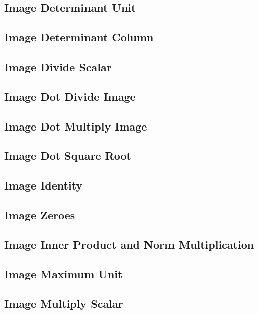 \documentclass[11pt]{article}
\begin{document}
\subsection{Image Determinant Unit}

\subsection{Image Determinant Column}

\subsection{Image Divide Scalar}

\subsection{Image Dot Divide Image}

\subsection{Image Dot Multiply Image}

\subsection{Image Dot Square Root}

\subsection{Image Identity}

\newpage
\subsection{Image Zeroes}

\subsection{Image Inner Product and Norm Multiplication}

\subsection{Image Maximum Unit}

\subsection{Image Multiply Scalar}
\end{document}
